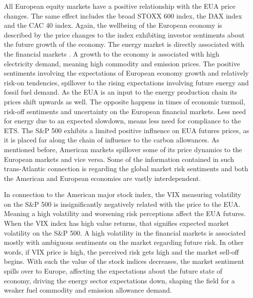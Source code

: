 \documentclass[12pt, letterpaper]{article}
\begin{document}
All European equity markets have a positive relationship with the EUA price changes. The same effect includes the broad STOXX 600 index, the DAX index and the CAC 40 index. Again, the wellbeing of the European economy is described by the price changes to the index exhibiting investor sentiments about the future growth of the economy. The energy market is directly associated with the financial markets \parencite{wang2020}. A growth to the economy is associated with high electricity demand, meaning high commodity and emission prices. The positive sentiments involving the expectations of European economy growth and relatively risk-on tendencies, spillover to the rising expectations involving future energy and fossil fuel demand. As the EUA is an input to the energy production chain its prices shift upwards as well. The opposite happens in times of economic turmoil, risk-off sentiments and uncertainty on the European financial markets. Less need for energy due to an expected slowdown, means less need for compliance to the ETS. The S\&P 500 exhibits a limited positive influence on EUA futures prices, as it is placed far along the chain of influence to the carbon allowances. As mentioned before, American markets spillover some of its price dynamics to the European markets and vice versa. Some of the information contained in such trans-Atlantic connection is regarding the global market risk sentiments and both the American and European economies are vastly interdependent.

In connection to the American major stock index, the VIX measuring volatility on the S\&P 500 is insignificantly negatively related with the price to the EUA. Meaning a high volatility and worsening risk perceptions affect the EUA futures. When the VIX index has high value returns, that signifies expected market volatility on the S\&P 500. A high volatility in the financial markets is associated mostly with ambiguous sentiments on the market regarding future risk. In other words, if VIX price is high, the perceived risk gets high and the market sell-off begins. With such the value of the stock indices decreases, the market sentiment spills over to Europe, affecting the expectations about the future state of economy, driving the energy sector expectations down, shaping the field for a weaker fuel commodity and emission allowance demand.
\end{document}
